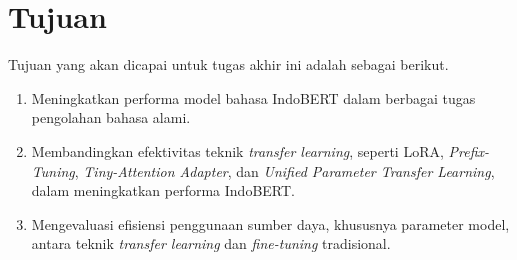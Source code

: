 \section{Tujuan}

Tujuan yang akan dicapai untuk tugas akhir ini adalah sebagai berikut.

\begin{enumerate}
    \item Meningkatkan performa model bahasa IndoBERT dalam berbagai tugas pengolahan bahasa alami.
    \item Membandingkan efektivitas teknik \textit{transfer learning}, seperti LoRA, \textit{Prefix-Tuning}, \textit{Tiny-Attention Adapter}, dan \textit{Unified Parameter Transfer Learning}, dalam meningkatkan performa IndoBERT.
    \item Mengevaluasi efisiensi penggunaan sumber daya, khususnya parameter model, antara teknik \textit{transfer learning} dan \textit{fine-tuning} tradisional.
\end{enumerate}